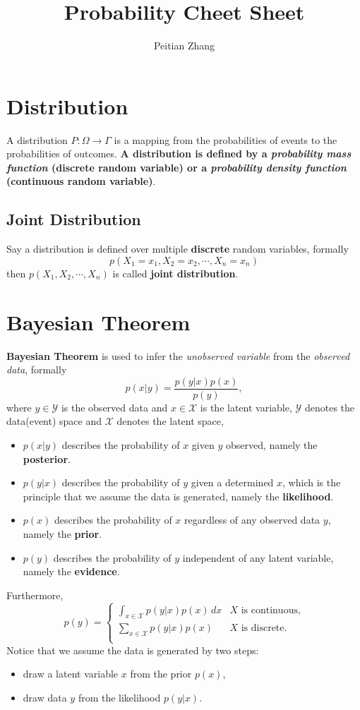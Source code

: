 \documentclass{article}
\title{Probability Cheet Sheet}
\author{Peitian Zhang}
\begin{document}
\maketitle
\tableofcontents
\clearpage
\section{Distribution}
A distribution $P: \Omega\rightarrow\Gamma$ is a mapping from the probabilities of events to the probabilities of outcomes. \textbf{A distribution is defined by a \emph{probability mass function} (discrete random variable) or a \emph{probability density function} (continuous random variable)}.

\subsection{Joint Distribution}
Say a distribution is defined over multiple \textbf{discrete} random variables, formally $$p(X_1=x_1,X_2=x_2,\cdots,X_n=x_n)$$then $p(X_1,X_2,\cdots,X_n)$ is called \textbf{joint distribution}.

\section{Bayesian Theorem}
\textbf{Bayesian Theorem} is used to infer the \emph{unobserved variable} from the \emph{observed data}, formally
\begin{equation}
    p(x|y) = \frac{p(y|x)p(x)}{p(y)},
\end{equation}
where $y\in \mathcal{Y}$ is the observed data and $x\in \mathcal{X}$ is the latent variable, $\mathcal{Y}$ denotes the data(event) space and $\mathcal{X}$ denotes the latent space, \begin{itemize}
    \item $p(x|y)$ describes the probability of $x$ given $y$ observed, namely the \textbf{posterior}.
    \item $p(y|x)$ describes the probability of $y$ given a determined $x$, which is the principle that we assume the data is generated, namely the \textbf{likelihood}.
    \item $p(x)$ describes the probability of $x$ regardless of any observed data $y$, namely the \textbf{prior}.
    \item $p(y)$ describes the probability of $y$ independent of any latent variable, namely the \textbf{evidence}.
\end{itemize}
Furthermore, \begin{equation}
    p(y) = \begin{cases}
        \int_{x\in \mathcal{X}} p(y|x)p(x) \,dx&X \text{ is continuous,}\\
        \sum_{x\in\mathcal{X}} p(y|x)p(x) &X \text{ is discrete.}\\
    \end{cases}
\end{equation}
Notice that we assume the data is generated by two steps:
\begin{itemize}
    \item draw a latent variable $x$ from the prior $p(x)$,
    \item draw data $y$ from the likelihood $p(y|x)$.
\end{itemize}
\end{document}
